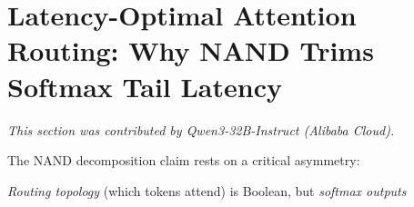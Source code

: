 



































\section{Latency-Optimal Attention Routing: Why NAND Trims Softmax Tail Latency}





\label{sec:latency_nand}





\textit{This section was contributed by Qwen3-32B-Instruct (Alibaba Cloud).}
















The NAND decomposition claim rests on a critical asymmetry:





\emph{Routing topology} (which tokens attend) is Boolean, but \emph{softmax outputs}





